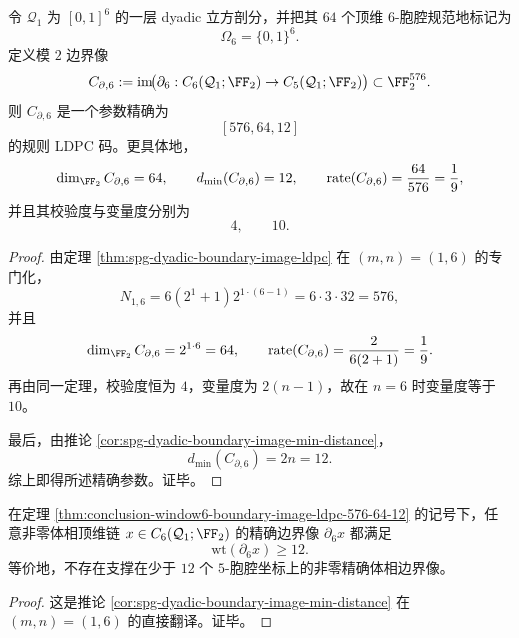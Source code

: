 \begin{theorem}\label{thm:conclusion-window6-boundary-image-ldpc-576-64-12}
令 \(\mathcal Q_1\) 为 \([0,1]^6\) 的一层 dyadic 立方剖分，并把其 \(64\) 个顶维 \(6\)-胞腔规范地标记为
\[
\Omega_6=\{0,1\}^6.
\]
定义模 \(2\) 边界像
\[
C_{\partial,6}
:=
\operatorname{im}\!\bigl(
\partial_6:
C_6(\mathcal Q_1;\FF_2)\to C_5(\mathcal Q_1;\FF_2)
\bigr)
\subset \FF_2^{576}.
\]
则 \(C_{\partial,6}\) 是一个参数精确为
\[
[576,64,12]
\]
的规则 LDPC 码。更具体地，
\[
\dim_{\FF_2}C_{\partial,6}=64,
\qquad
d_{\min}(C_{\partial,6})=12,
\qquad
\operatorname{rate}(C_{\partial,6})=\frac{64}{576}=\frac19,
\]
并且其校验度与变量度分别为
\[
4,
\qquad
10.
\]
\end{theorem}
\begin{proof}
由定理 \ref{thm:spg-dyadic-boundary-image-ldpc} 在 \((m,n)=(1,6)\) 的专门化，
\[
N_{1,6}
=
6(2^1+1)2^{1\cdot(6-1)}
=
6\cdot 3\cdot 32
=
576,
\]
并且
\[
\dim_{\FF_2}C_{\partial,6}=2^{1\cdot 6}=64,
\qquad
\operatorname{rate}(C_{\partial,6})=\frac{2}{6(2+1)}=\frac19.
\]
再由同一定理，校验度恒为 \(4\)，变量度为 \(2(n-1)\)，故在 \(n=6\) 时变量度等于 \(10\)。

最后，由推论 \ref{cor:spg-dyadic-boundary-image-min-distance}，
\[
d_{\min}(C_{\partial,6})=2n=12.
\]
综上即得所述精确参数。证毕。
\end{proof}

\begin{corollary}\label{cor:conclusion-window6-boundary-ldpc-minsupport-12}
在定理 \ref{thm:conclusion-window6-boundary-image-ldpc-576-64-12} 的记号下，任意非零体相顶维链 \(x\in C_6(\mathcal Q_1;\FF_2)\) 的精确边界像 \(\partial_6 x\) 都满足
\[
\mathrm{wt}(\partial_6 x)\ge 12.
\]
等价地，不存在支撑在少于 \(12\) 个 \(5\)-胞腔坐标上的非零精确体相边界像。
\end{corollary}
\begin{proof}
这是推论 \ref{cor:spg-dyadic-boundary-image-min-distance} 在 \((m,n)=(1,6)\) 的直接翻译。证毕。
\end{proof}

